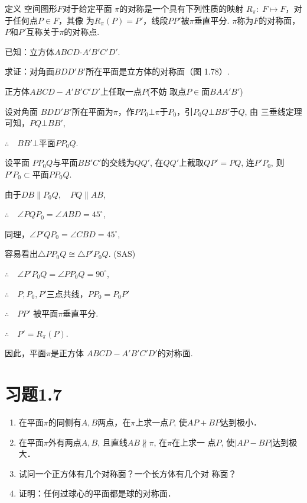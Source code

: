 \begin{blk}
  {定义} 空间图形$F$对于给定平面
$\pi$的对称是一个具有下列性质的映射
$R_{\pi}:\; F\mapsto F$，对于任何点$P\in F$，其像
为$R_{\pi}(P)=P'$，线段$PP'$被$\pi$垂直平分. 
$\pi$称为$F$的对称面，$P$和$P'$互称关于$\pi$的对称点. 
\end{blk}


\begin{example}
  已知：立方体$ABCD$-$A' B'C' D'$.

  求证：对角面$BDD'B'$所在平面是立方体的对称面（图
  1.78）. 
\end{example}

\begin{solution}
  正方体$ABCD-  A'B'C'D'$上任取一点$P$(不妨
  取点$P\in$面$BAA'B'$) 
  
  设对角面
  $BDD'B'$所在平面为$\pi$，作$PP_0
  \bot \pi$于$P_0$，引$P_0Q\bot BB'$于$Q$, 由
  三垂线定理可知，$PQ\bot BB'$, 

  $\therefore\quad BB'\bot $平面$PP_0Q$.
  
  设平面
  $PP_0Q$与平面$BB'C'$的交线为$QQ'$, 在$QQ'$上截取$QP'=PQ$, 
  连$P'P_0$, 则$P'P_0\subset $平面$PP_0Q$. 
  
  由于$DB\parallel P_0Q,\quad PQ\parallel AB$,

$\therefore\quad \angle PQP_0=\angle ABD=45^{\circ}$, 

同理，$\angle P'QP_0=\angle CBD=45^{\circ}$, 

容易看出$\triangle PP_0Q\cong \triangle P'P_0Q$. (SAS)

$\therefore\quad \angle P'P_0Q=\angle PP_0Q=90^{\circ}$,

$\therefore\quad P,P_0,P'$三点共线，$PP_0=P_0P'$

$\therefore\quad PP'$
  被平面$\pi$垂直平分. 
  
  $\therefore\quad P'=R_{\pi}(P)$. 
  
  因此，平面$\pi$是正方体
  $ABCD-A'B'C'D'$的对称面. 
\end{solution}


\section*{习题1.7}

\begin{enumerate}
    \item 在平面$\pi$的同侧有$A,B$两点，在$\pi$上求一点$P$, 使$AP+
    BP$达到极小．
    \item 在平面$\pi$外有两点$A,B$, 且直线$AB\nparallel \pi$, 在$\pi$在上求一
    点$P$, 使$|AP-BP|$达到极大．
    \item 试问一个正方体有几个对称面？一个长方体有几个对
    称面？
    \item 证明：任何过球心的平面都是球的对称面．
\end{enumerate}

